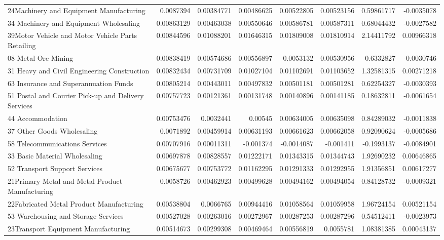 \documentclass{monashthesis}
\begin{document}
\begin{table}[ht]
{\begin{tabular}{|l|r|rrrr|rr|}
    24Machinery and Equipment Manufacturing & 0.0087394 & 0.00384771 & 0.00486625 & 0.00522805 & 0.00523156 & 0.59861717 & -0.0035078 \\
    34 Machinery and Equipment Wholesaling & 0.00863129 & 0.00463038 & 0.00550646 & 0.00586781 & 0.00587311 & 0.68044432 & -0.0027582 \\
    39Motor Vehicle and Motor Vehicle Parts Retailing & 0.00844596 & 0.01088201 & 0.01646315 & 0.01809008 & 0.01810914 & 2.14411792 & 0.00966318 \\
    08 Metal Ore Mining & 0.00838419 & 0.00574686 & 0.00556897 & 0.0053132 & 0.00530956 & 0.6332827 & -0.0030746 \\
    31 Heavy and Civil Engineering Construction & 0.00832434 & 0.00731709 & 0.01027104 & 0.01102691 & 0.01103652 & 1.32581315 & 0.00271218 \\
    63 Insurance and Superannuation Funds & 0.00805214 & 0.00443011 & 0.00497832 & 0.00501181 & 0.00501281 & 0.62254327 & -0.0030393 \\
    51 Postal and Courier Pick-up and Delivery Services & 0.00757723 & 0.00121361 & 0.00131748 & 0.00140896 & 0.00141185 & 0.18632811 & -0.0061654 \\
    44 Accommodation & 0.00753476 & 0.0032441 & 0.00545 & 0.00634005 & 0.00635098 & 0.84289032 & -0.0011838 \\
    37 Other Goods Wholesaling & 0.0071892 & 0.00459914 & 0.00631193 & 0.00661623 & 0.00662058 & 0.92090624 & -0.0005686 \\
    58 Telecommunications Services & 0.00707916 & 0.00011311 & -0.001374 & -0.0014087 & -0.001411 & -0.1993137 & -0.0084901 \\
  33 Basic Material Wholesaling & 0.00697878 & 0.00828557 & 0.01222171 & 0.01343315 & 0.01344743 & 1.92690232 & 0.00646865 \\
    52 Transport Support Services & 0.00675677 & 0.00753772 & 0.01162295 & 0.01291333 & 0.01292955 & 1.91356851 & 0.00617277 \\
    21Primary Metal and Metal Product Manufacturing & 0.0058726 & 0.00462923 & 0.00499628 & 0.00494162 & 0.00494054 & 0.84128732 & -0.0009321 \\
    22Fabricated Metal Product Manufacturing & 0.00538804 & 0.0066765 & 0.00944416 & 0.01058564 & 0.01059958 & 1.96724154 & 0.00521154 \\
    53 Warehousing and Storage Services & 0.00527028 & 0.00263016 & 0.00272967 & 0.00287253 & 0.00287296 & 0.54512411 & -0.0023973 \\
    23Transport Equipment Manufacturing & 0.00514673 & 0.00299308 & 0.00469464 & 0.00556819 & 0.0055781 & 1.08381385 & 0.00043137 \\

\end{tabular}}
\end{table}
\end{document}
